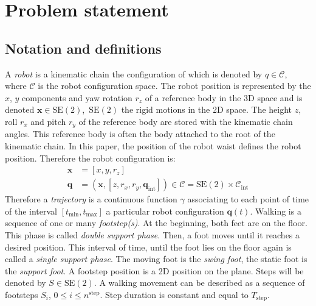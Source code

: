 \section{Problem statement} \label{problem}
\subsection{Notation and definitions}
%
A \emph{robot} is a kinematic chain the configuration of which is
denoted by \mbox{$q \in \mathcal{C}$}, where $\mathcal{C}$ is the
robot configuration space.
%
The robot position is represented by the $x$, $y$ components
and yaw rotation $r_z$ of a reference body in the 3D space and is
denoted \mbox{$\mathbf{x} \in \text{SE}(2)$, $\text{SE}(2)$} the rigid
motions in the 2D space.  The height $z$, roll $r_x$ and pitch $r_y$
of the reference body are stored with the kinematic chain angles.
%
This reference body is often the body attached to the root of the
kinematic chain. In this paper, the position of the robot waist
defines the robot position. Therefore the robot configuration is:
%
\begin{equation} \label{eq:cfg}
  \begin{aligned}
    \mathbf{x} &= [x, y, r_z]\\
    \mathbf{q} &= (\mathbf{x}, [z, r_x, r_y, \mathbf{q}_{\text{int}}])
    \in \mathcal{C} = \text{SE}(2) \times \mathcal{C}_{\text{int}}
  \end{aligned}
\end{equation}
%
Therefore a \emph{trajectory} is a continuous function $\gamma$
associating to each point of time of the interval
\mbox{$[t_{\text{min}}, t_{\text{max}}]$} a particular robot
configuration \mbox{$\textbf{q}(t)$}.
%
%
%
%
%
%
Walking is a sequence of one or many \emph{footstep(s)}. At the
beginning, both feet are on the floor. This phase is called
\emph{double support phase}. Then, a foot moves until it reaches a
desired position. This interval of time, until the foot lies on the
floor again is called a \emph{single support phase}. The moving foot
is the \emph{swing foot}, the static foot is the \emph{support foot}.
%
A footstep position is a 2D position on the plane. Steps will be
denoted by \mbox{$S \in \text{SE}(2)$}.
%
A walking movement can be described as a sequence of footsteps $S_i$,
\mbox{$0 \leq i \leq n^{\text{step}}$}. Step duration is constant and equal
to $T_{\text{step}}$.
%
%
